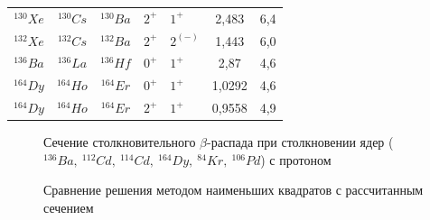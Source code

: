 \documentclass[14pt, a4paper]{article}
\begin{document}
\begin{table}
\begin{tabular}{|c|c|c|HHc|c|}
		$^{130}Xe$ & $^{130}Cs$ &$^{130}Ba$& $2^+$  &  $1^+$  & 2,483 &   6,4   \\
		$^{132}Xe$ & $^{132}Cs$ &$^{132}Ba$& $2^+$  &  $2^{(-)}$  & 1,443 &   6,0   \\
		$^{136}Ba$ & $^{136}La$ &$^{136}Hf$& $0^+$  &  $1^+$  & 2,87 &   4,6   \\
		$^{164}Dy$ & $^{164}Ho$ &$^{164}Er$& $0^+$  &  $1^+$  & 1,0292 &   4,6   \\
		$^{164}Dy$ & $^{164}Ho$ &$^{164}Er$& $2^+$  &  $1^+$  & 0,9558 &   4,9   \\
		\hline
	\end{tabular}
	\label{Tels}
\end{table}


\begin{figure}[ht]
	\caption{Сечение столкновительного $\beta$-распада при столкновении ядер ($^{136}Ba, \ ^{112}Cd, \ ^{114}Cd, \ ^{164}Dy, \ ^{84}Kr, \ ^{106}Pd$) с протоном}
	\label{ris:sigma-full}
\end{figure}


\begin{figure}[ht]
	\caption{Сравнение решения методом наименьших квадратов с рассчитанным сечением}
	\label{ris:2}
\end{figure}
\end{document}
